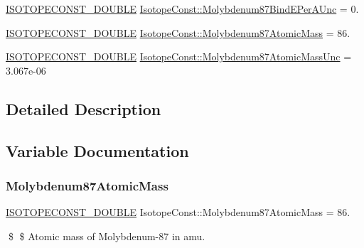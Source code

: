 \begin{DoxyCompactItemize}
\mbox{\hyperlink{group___isotope_const-_macros_ga8f45a7272ce02c0b4c65c44636ed719a}{I\+S\+O\+T\+O\+P\+E\+C\+O\+N\+S\+T\+\_\+\+D\+O\+U\+B\+LE}} \mbox{\hyperlink{group___isotope_const-_molybdenum-_mo87_ga7c415113d1b145439b8e7f79fe0acd4d}{Isotope\+Const\+::\+Molybdenum87\+Bind\+E\+Per\+A\+Unc}} = 0.
\item 
\mbox{\hyperlink{group___isotope_const-_macros_ga8f45a7272ce02c0b4c65c44636ed719a}{I\+S\+O\+T\+O\+P\+E\+C\+O\+N\+S\+T\+\_\+\+D\+O\+U\+B\+LE}} \mbox{\hyperlink{group___isotope_const-_molybdenum-_mo87_gaa2f3dcbe29ffbdebdb9a6d271635784f}{Isotope\+Const\+::\+Molybdenum87\+Atomic\+Mass}} = 86.
\item 
\mbox{\hyperlink{group___isotope_const-_macros_ga8f45a7272ce02c0b4c65c44636ed719a}{I\+S\+O\+T\+O\+P\+E\+C\+O\+N\+S\+T\+\_\+\+D\+O\+U\+B\+LE}} \mbox{\hyperlink{group___isotope_const-_molybdenum-_mo87_ga55c529641c9625a4321aada80c5e2dff}{Isotope\+Const\+::\+Molybdenum87\+Atomic\+Mass\+Unc}} = 3.\+067e-\/06
\end{DoxyCompactItemize}


\subsection{Detailed Description}


\subsection{Variable Documentation}
\mbox{\label{group___isotope_const-_molybdenum-_mo87_gaa2f3dcbe29ffbdebdb9a6d271635784f}} 
\subsubsection{\texorpdfstring{Molybdenum87\+Atomic\+Mass}{Molybdenum87AtomicMass}}
{\footnotesize\ttfamily \mbox{\hyperlink{group___isotope_const-_macros_ga8f45a7272ce02c0b4c65c44636ed719a}{I\+S\+O\+T\+O\+P\+E\+C\+O\+N\+S\+T\+\_\+\+D\+O\+U\+B\+LE}} Isotope\+Const\+::\+Molybdenum87\+Atomic\+Mass = 86.}

\$ \$ Atomic mass of Molybdenum-\/87 in amu. \mbox{\label{group___isotope_const-_molybdenum-_mo87_ga55c529641c9625a4321aada80c5e2dff}} 

